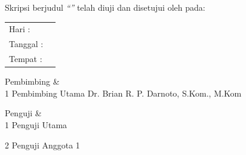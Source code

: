 

\noindent Skripsi berjudul \textit{``\titleUpperCase''} telah diuji dan disetujui oleh \faculty{} \university{} pada:

\vspace{1em}
\noindent
\begin{tabular}{@{}ll}
Hari    : & \examinationDay{} \\
Tanggal : & \examinationDate{} \\
Tempat  : & \examinationPlace{} \\
\end{tabular}


\vspace{2em}
\noindent
\begin{approvalboard}

Pembimbing &  \\[0.5em]

\supervisorrow
{1}
{Pembimbing Utama}
{Dr. Brian R. P. Darnoto, S.Kom., M.Kom}
{\supervisorNIP}

Penguji & \\[0.5em]

\supervisorrow
{1}
{Penguji Utama}
{\examinerOne}
{\firstExaminerNIP}

\supervisorrow
{2}
{Penguji Anggota 1}
{\examinerTwo}
{\secondExaminerNIP}

\end{approvalboard}

\newpage

